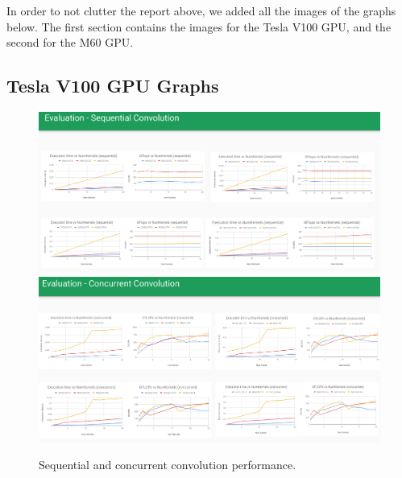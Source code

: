 \documentclass[sigconf]{acmart}
\begin{document}
In order to not clutter the report above, we added all the images of the graphs below. The first section contains the 
images for the Tesla V100 GPU, and the second for the M60 GPU. 

\subsection{Tesla V100 GPU Graphs}

\begin{figure}[htb]
  \centering
  \includegraphics[width=\textwidth]{img/seq-conv}
  \includegraphics[width=\textwidth]{img/conc-conv}
  \caption{Sequential and concurrent convolution performance.}
\end{figure}
\end{document}
